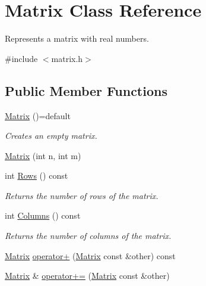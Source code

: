 \hypertarget{classMatrix}{}\section{Matrix Class Reference}
\label{classMatrix}


Represents a matrix with real numbers.  




{\ttfamily \#include $<$matrix.\+h$>$}

\subsection*{Public Member Functions}
\begin{DoxyCompactItemize}
\item 
\mbox{\label{classMatrix_a12d35ef1824cd847868a8703035b0d5d}} 
\hyperlink{classMatrix_a12d35ef1824cd847868a8703035b0d5d}{Matrix} ()=default
\begin{DoxyCompactList}\small\item\em Creates an empty matrix. \end{DoxyCompactList}\item 
\hyperlink{classMatrix_ae157f910061b3e1155b17b62583bde57}{Matrix} (int n, int m)
\item 
\mbox{\label{classMatrix_a409518fdf191a193bf544e0148fdc9cc}} 
int \hyperlink{classMatrix_a409518fdf191a193bf544e0148fdc9cc}{Rows} () const
\begin{DoxyCompactList}\small\item\em Returns the number of rows of the matrix. \end{DoxyCompactList}\item 
\mbox{\label{classMatrix_a742ff4cea157cd4d7a1943ddbc702028}} 
int \hyperlink{classMatrix_a742ff4cea157cd4d7a1943ddbc702028}{Columns} () const
\begin{DoxyCompactList}\small\item\em Returns the number of columns of the matrix. \end{DoxyCompactList}\item 
\hyperlink{classMatrix}{Matrix} \hyperlink{classMatrix_a2c888c6a7fe7a4ea3b603d17fe3f77e0}{operator+} (\hyperlink{classMatrix}{Matrix} const \&other) const
\item 
\hyperlink{classMatrix}{Matrix} \& \hyperlink{classMatrix_a5f5d62f853a2ed97f2ba437036b1724d}{operator+=} (\hyperlink{classMatrix}{Matrix} const \&other)

\end{DoxyCompactItemize}
